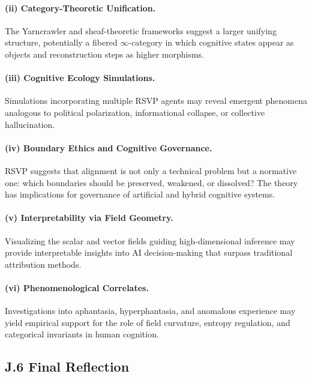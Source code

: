 \documentclass[12pt]{article}
\begin{document}
\paragraph{(ii) Category-Theoretic Unification.}  
The Yarncrawler and sheaf-theoretic frameworks suggest a larger unifying 
structure, potentially a fibered $\infty$-category in which cognitive states 
appear as objects and reconstruction steps as higher morphisms.

\paragraph{(iii) Cognitive Ecology Simulations.}  
Simulations incorporating multiple RSVP agents may reveal emergent phenomena 
analogous to political polarization, informational collapse, or 
collective hallucination.

\paragraph{(iv) Boundary Ethics and Cognitive Governance.}  
RSVP suggests that alignment is not only a technical problem but a normative 
one: which boundaries should be preserved, weakened, or dissolved?  
The theory has implications for governance of artificial and hybrid cognitive 
systems.

\paragraph{(v) Interpretability via Field Geometry.}  
Visualizing the scalar and vector fields guiding high-dimensional inference 
may provide interpretable insights into AI decision-making that surpass 
traditional attribution methods.

\paragraph{(vi) Phenomenological Correlates.}  
Investigations into aphantasia, hyperphantasia, and anomalous experience may 
yield empirical support for the role of field curvature, entropy regulation, 
and categorical invariants in human cognition.

\subsection*{J.6 Final Reflection}
\end{document}
